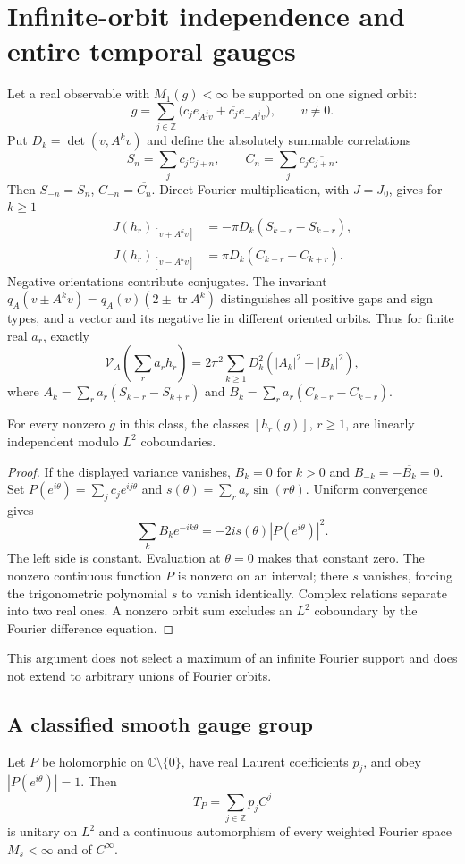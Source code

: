 \section{Infinite-orbit independence and entire temporal gauges}
\label{sec:entire-gauge}
Let a real observable with $M_1(g)<\infty$ be supported on one signed orbit:
\[
 g=\sum_{j\in\mathbb Z}
       \bigl(c_je_{A^jv}+\overline{c_j}e_{-A^jv}\bigr),\qquad v\ne0.
\]
Put $D_k=\det(v,A^kv)$ and define the absolutely summable correlations
\[
 S_n=\sum_jc_jc_{j+n},\qquad
 C_n=\sum_jc_j\overline{c_{j+n}}.
\]
Then $S_{-n}=S_n$, $C_{-n}=\overline{C_n}$. Direct Fourier multiplication,
with $J=J_0$, gives for $k\ge1$
\begin{align*}
 J(h_r)_{[v+A^kv]}&=-\pi D_k(S_{k-r}-S_{k+r}),\\
 J(h_r)_{[v-A^kv]}&= \pi D_k(C_{k-r}-C_{k+r}).
\end{align*}
Negative orientations contribute conjugates. The invariant
$q_A(v\pm A^kv)=q_A(v)(2\pm\operatorname{tr}A^k)$ distinguishes all positive
gaps and sign types, and a vector and its negative lie in different
oriented orbits. Thus for finite real $a_r$, exactly
\[
 \mathcal V_A\!\left(\sum_ra_rh_r\right)
 =2\pi^2\sum_{k\ge1}D_k^2(|A_k|^2+|B_k|^2),
\]
where $A_k=\sum_ra_r(S_{k-r}-S_{k+r})$ and
$B_k=\sum_ra_r(C_{k-r}-C_{k+r})$.

\begin{theorem}\label{thm:infinite-orbit}
For every nonzero $g$ in this class, the classes $[h_r(g)]$, $r\ge1$, are
linearly independent modulo $L^2$ coboundaries.
\end{theorem}
\begin{proof}
If the displayed variance vanishes, $B_k=0$ for $k>0$ and
$B_{-k}=-\overline{B_k}=0$. Set
$P(e^{i\theta})=\sum_jc_je^{ij\theta}$ and
$s(\theta)=\sum_ra_r\sin(r\theta)$. Uniform convergence gives
\[
 \sum_kB_ke^{-ik\theta}=-2i s(\theta)|P(e^{i\theta})|^2.
\]
The left side is constant. Evaluation at $\theta=0$ makes that constant
zero. The nonzero continuous function $P$ is nonzero on an interval; there
$s$ vanishes, forcing the trigonometric polynomial $s$ to vanish
identically. Complex relations separate into two real ones. A nonzero orbit
sum excludes an $L^2$ coboundary by the Fourier difference equation.
\end{proof}
This argument does not select a maximum of an infinite Fourier support and
does not extend to arbitrary unions of Fourier orbits.

\subsection{A classified smooth gauge group}
Let $P$ be holomorphic on $\mathbb C\setminus\{0\}$, have real Laurent
coefficients $p_j$, and obey $|P(e^{i\theta})|=1$. Then
\[
 T_P=\sum_{j\in\mathbb Z}p_jC^j
\]
is unitary on $L^2$ and a continuous automorphism of every weighted Fourier
space $M_s<\infty$ and of $C^\infty$.


